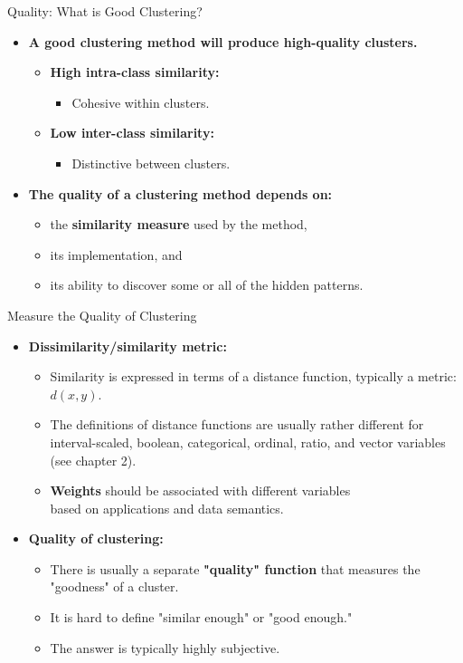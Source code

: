 \begin{frame}{Quality: What is Good Clustering?}
	\begin{itemize}
		\item \textbf{A good clustering method will produce high-quality 
		clusters.}
		\begin{itemize}
			\item \textbf{\color{airforceblue}High intra-class similarity:}
			\begin{itemize}
				\item Cohesive within clusters.
			\end{itemize}
			\item \textbf{\color{airforceblue}Low inter-class similarity:}
			\begin{itemize}
				\item Distinctive between clusters.
			\end{itemize}
		\end{itemize}
		\item \textbf{The {\color{airforceblue}quality} of a clustering method 
		depends on:}
		\begin{itemize}
			\item the \textbf{\color{airforceblue}similarity measure} used by 
			the method,
			\item its implementation, and
			\item its ability to discover some or all of the hidden patterns.
		\end{itemize}
	\end{itemize}
\end{frame}

\begin{frame}{Measure the Quality of Clustering}
	\begin{itemize}
		\item \textbf{Dissimilarity/similarity metric:}
		\begin{itemize}
			\item Similarity is expressed in terms of a distance function, 
			typically a metric: $d(x,y)$.
			\item The definitions of distance functions are usually rather 
			different for interval-scaled, boolean, categorical, ordinal, 
			ratio, and vector variables (see chapter 2).
			\item \textbf{\color{airforceblue}Weights} should be associated 
			with different variables \\
			based on applications and data semantics.
		\end{itemize}
		\item \textbf{Quality of clustering:}
		\begin{itemize}
			\item There is usually a separate 
			\textbf{\color{airforceblue}"quality" function} that measures the 
			"goodness" of a cluster.
			\item It is hard to define "similar enough" or "good enough."
			\item The answer is typically highly subjective.
		\end{itemize}
	\end{itemize}
\end{frame}

